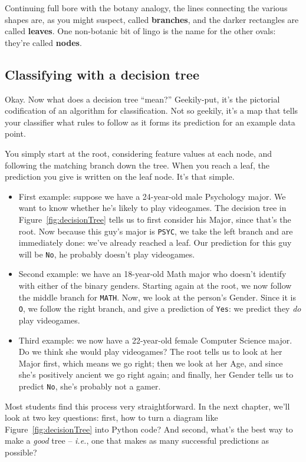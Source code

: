 
Continuing full bore with the botany analogy, the lines connecting the various
shapes are, as you might suspect, called \textbf{branches}, and the darker
rectangles are called \textbf{leaves}. One non-botanic bit of lingo is the name
for the other ovals: they're called \textbf{nodes}.

\subsection{Classifying with a decision tree}

Okay. Now what does a decision tree ``mean?'' Geekily-put, it's the pictorial
codification of an algorithm for classification. Not so geekily, it's a map
that tells your classifier what rules to follow as it forms its prediction for
an example data point.

You simply start at the root, considering feature values at each node, and
following the matching branch down the tree. When you reach a leaf, the
prediction you give is written on the leaf node. It's that simple.

\begin{itemize}

\label{decisionTreeExamples}
\item[\leftpointright] First example: suppose we have a 24-year-old male
Psychology major. We want to know whether he's likely to play videogames. The
decision tree in Figure~\ref{fig:decisionTree} tells us to first consider his
\textsf{Major}, since that's the root. Now because this guy's major is
\texttt{PSYC}, we take the left branch and are immediately done: we've already
reached a leaf. Our prediction for this guy will be \texttt{No}, he probably
doesn't play videogames.

\item[\leftpointright] Second example: we have an 18-year-old Math major who
doesn't identify with either of the binary genders. Starting again at the root,
we now follow the middle branch for \texttt{MATH}. Now, we look at the person's
\textsf{Gender}. Since it is \texttt{O}, we follow the right branch, and give a
prediction of \texttt{Yes}: we predict they \textit{do} play videogames.

\item[\leftpointright] Third example: we now have a 22-year-old female Computer
Science major. Do we think she would play videogames? The root tells us to look
at her \textsf{Major} first, which means we go right; then we look at her
\textsf{Age}, and since she's positively ancient we go right again; and
finally, her \textsf{Gender} tells us to predict \texttt{No}, she's probably
not a gamer.

\end{itemize}

Most students find this process very straightforward. In the next chapter,
we'll look at two key questions: first, how to turn a diagram like
Figure~\ref{fig:decisionTree} into Python code? And second, what's the best way
to make a \textit{good} tree -- \textit{i.e.}, one that makes as many
successful predictions as possible? 

